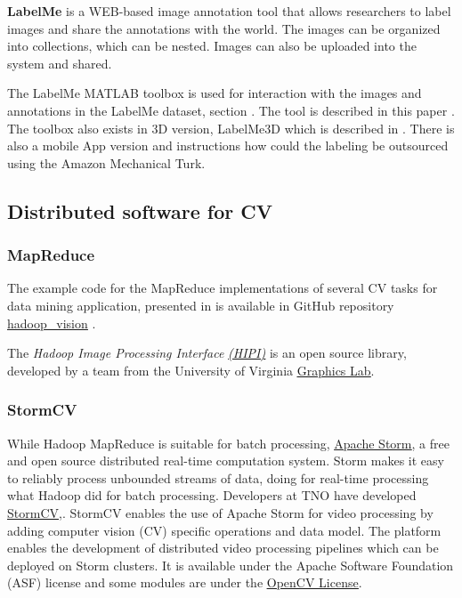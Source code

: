 {{\bf LabelMe} is a WEB-based image annotation tool that allows researchers to label images and share the annotations with the world. The images can be organized into collections, which can be nested. Images can also be uploaded into the system and shared.

The LabelMe MATLAB toolbox is used for interaction with the images and annotations in the LabelMe dataset, section . The tool is described in this paper
\cite{Russell2008}. The toolbox also exists in 3D version, LabelMe3D which is described in \cite{Russell2009}. There is also a mobile App version and instructions how could the labeling be outsourced using the Amazon Mechanical Turk.

\subsection{Distributed software for CV}\label{subsec:largescalesoft}

\subsubsection{MapReduce}\label{subsubsec:MapReduce}
The example code for the MapReduce implementations of several CV tasks for data mining application, presented in \cite{White:2010} is available in  GitHub repository \href{https://github.com/bwhite/hadoop_vision}{\underline{hadoop\_vision}} \cite{hadoopvision_soft}.

The {\em Hadoop Image Processing Interface} \href{http://hipi.cs.virginia.edu}{\em \underline{(HIPI)}} \cite{hipi_soft} is an open source library, developed by a team from the University of Virginia \href{http://www.cs.virginia.edu/~gfx/pmwiki/index.php}{\underline{Graphics Lab}}.

\subsubsection{StormCV}\label{subsubsec:StormCV}
While Hadoop MapReduce is suitable for batch processing, \href{https://storm.apache.org/}{\underline{Apache Storm}},\cite{storm_soft} a free and open source distributed real-time computation system. Storm makes it easy to reliably process unbounded streams of data, doing for real-time processing what Hadoop did for batch processing.
Developers at TNO have developed  \href{https://github.com/sensorstorm/StormCV}{\underline{StormCV}},\cite{stormcv_soft}. StormCV enables the use of Apache Storm for video processing by adding computer vision (CV) specific operations and data model. The platform enables the development of distributed video processing pipelines which can be deployed on Storm clusters. It is available under the  Apache Software Foundation (ASF) license and some modules are under the \href{http://opencv.org/license.html}{\underline{OpenCV License}}.

}
